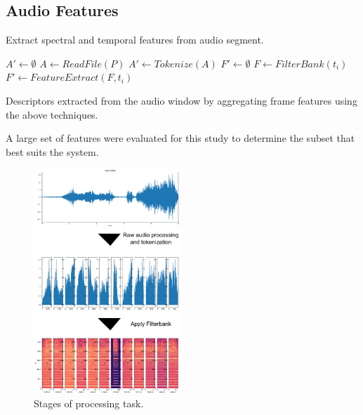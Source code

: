 \subsection{Audio Features}
\begin{algorithm}
    \caption{Extract spectral and temporal features from audio segment.}
    \label{alg:encoder}
    \SetAlgoLined
        
     {
        $A' \gets \emptyset$\;
        $A \gets ReadFile(P)$\;
        $A' \gets Tokenize(A)$\;
         {
            $F' \gets \emptyset$\;
            $F \gets FilterBank(t_i)$
            $F' \gets FeatureExtract(F, t_i)$
        }
    }
\end{algorithm}


\begin{table}[t!]
\centering

\caption{
 Descriptors extracted from the audio window by
 aggregating frame features using the above techniques. }
\label{tab:stats}
\end{table}

A large set of features were evaluated for this study to determine the subset that best suits the system.

\begin{figure}[h!]
    \centering
    \includegraphics[width=0.49\textwidth]{figures/processing-pipeline.png}
    \caption{Stages of processing task.}
    \label{fig:my-label}
\end{figure}

